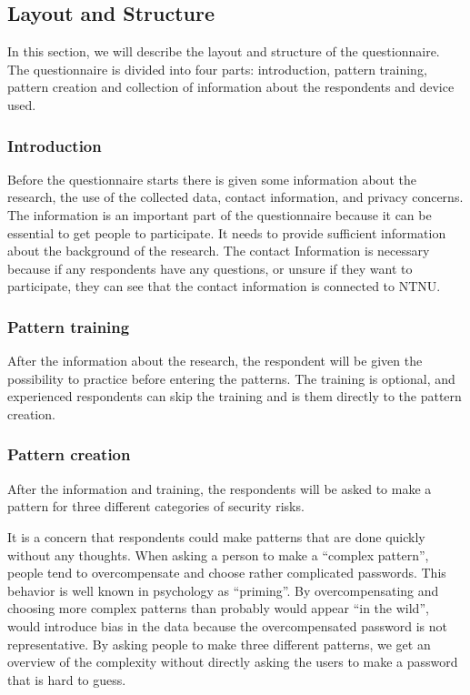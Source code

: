   \clearpage
  \subsection{Layout and Structure}\label{sec:layout}

  In this section, we will describe the layout and structure of the questionnaire. The questionnaire is divided into four parts: introduction, pattern training, pattern creation and collection of information about the respondents and device used. 

    \subsubsection*{Introduction}
    Before the questionnaire starts there is given some information about the research, the use of the collected data, contact information, and privacy concerns. The information is an important part of the questionnaire because it can be essential to get people to participate. It needs to provide sufficient information about the background of the research. The contact Information is necessary because if any respondents have any questions, or unsure if they want to participate, they can see that the contact information is connected to NTNU. 

    \subsubsection*{Pattern training}
    After the information about the research, the respondent will be given the possibility to practice before entering the patterns. The training is optional, and experienced respondents can skip the training and is  them directly to the pattern creation.

    \subsubsection*{Pattern creation}
    After the information and training, the respondents will be asked to make a pattern for three different categories of security risks.

    It is a concern that respondents could make patterns that are done quickly without any thoughts. When asking a person to make a ``complex pattern'', people tend to overcompensate and choose rather complicated passwords. This behavior is well known in psychology as ``priming''. By overcompensating and choosing more complex patterns than probably would appear ``in the wild'', would introduce bias in the data because the overcompensated password is not representative. By asking people to make three different patterns, we get an overview of the complexity without directly asking the users to make a password that is hard to guess.

